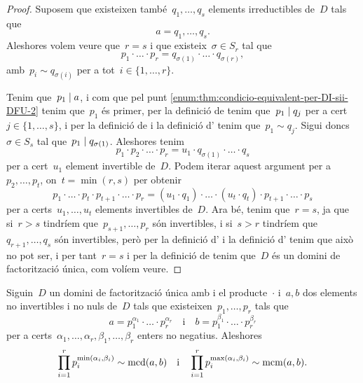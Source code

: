 \documentclass[../estructures-algebraiques.tex]{subfiles}
\begin{document}
\begin{proof}
        Suposem que existeixen també~\(q_{1},\dots,q_{s}\) elements irreductibles de~\(D\) tals que
        \[
            a=q_{1},\dots,q_{s}.
        \]
        Aleshores volem veure que~\(r=s\) i que existeix~\(\sigma\in S_{r}\) tal que
        \[
            p_{1}\cdot\ldots\cdot p_{r}=q_{\sigma(1)}\cdot\ldots\cdot q_{\sigma(r)},
        \]
        amb~\(p_{i}\sim q_{\sigma(i)}\) per a tot~\(i\in\{1,\dots,r\}\).

        Tenim que~\(p_{1}\mathrel{|} a\), i com que pel punt \eqref{enum:thm:condicio-equivalent-per-DI-sii-DFU-2} tenim que~\(p_{1}\) és primer, per la definició de  tenim que~\(p_{1}\mathrel{|} q_{j}\) per a cert~\(j\in\{1,\dots,s\}\), i per la definició de  i la definició d' tenim que~\(p_{1}\sim q_{j}\).
        Sigui doncs~\(\sigma\in S_{s}\) tal que~\(p_{1}\mathrel{|} q_{\sigma(1)}\).
        Aleshores tenim
        \[
            p_{1}\cdot p_{2}\cdot\ldots\cdot p_{r}=u_{1}\cdot q_{\sigma(1)}\cdot\ldots\cdot q_{s}
        \]
        per a cert~\(u_{1}\) element invertible de~\(D\).
        Podem iterar aquest argument per a~\(p_{2},\dots,p_{t}\), on~\(t=\min(r,s)\) per obtenir
        \[
            p_{1}\cdot\ldots\cdot p_{t}\cdot p_{t+1}\cdot\ldots\cdot p_{r}=(u_{1}\cdot q_{1})\cdot\ldots\cdot(u_{t}\cdot q_{t})\cdot p_{t+1}\cdot\ldots \cdot p_{s}
        \]
        per a certs~\(u_{1},\dots, u_{t}\) elements invertibles de~\(D\).
        Ara bé, tenim que~\(r=s\), ja que si~\(r>s\) tindríem que~\(p_{s+1},\dots,p_{r}\) són invertibles, i si~\(s>r\) tindríem que~\(q_{r+1},\dots,q_{s}\) són invertibles, però per la definició d' i la definició d' tenim que això no pot ser, i per tant~\(r=s\) i per la definició de  tenim que~\(D\) és un domini de factorització única, com volíem veure.
    \end{proof}
    \begin{proposition}
        Siguin~\(D\) un domini de factorització única amb i el producte~\(\cdot\) i~\(a,b\) dos elements no invertibles i no nuls de~\(D\) tals que existeixen~\(p_{1},\dots,p_{r}\) tals que
        \[
            a=p_{1}^{\alpha_{1}}\cdot\ldots\cdot p_{r}^{\alpha_{r}}\quad\text{i}\quad b=p_{1}^{\beta_{1}}\cdot\ldots\cdot p_{r}^{\beta_{r}}
        \]
        per a certs~\(\alpha_{1},\dots,\alpha_{r},\beta_{1},\dots,\beta_{r}\) enters no negatius.
        Aleshores
        \[
            \prod_{i=1}^{r}p_{i}^{\min(\alpha_{i},\beta_{i})}\sim\operatorname{mcd}(a,b)\quad\text{i}\quad\prod_{i=1}^{r}p_{i}^{\max(\alpha_{i},\beta_{i})}\sim\operatorname{mcm}(a,b).
        \]
    \end{proposition}
\end{document}
